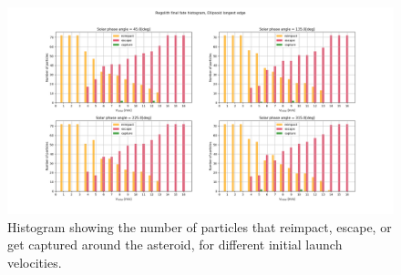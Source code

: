 \begin{figure}[htb]
\centering
\captionsetup{justification=centering}
\includegraphics[angle=90, width=\textwidth, height=\textheight]{longest_edge_perturbations/3.2Density_1cmSize/final_fate_versus_launch_velocity_histogram_all_solar_phases.png}
\caption{Histogram showing the number of particles that reimpact, escape, or get captured around the asteroid, for different initial launch velocities.}
\label{fig:longest_edge_perturbations_final_fate_histogram}
\end{figure}
\FloatBarrier
